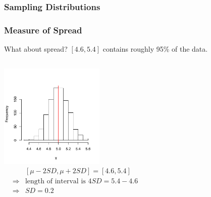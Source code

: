 \documentclass[slides]{beamer}
\newcommand{\blue}[1]{\textcolor{blue2}{#1}}
\newcommand{\xbar}{\overline{x}}
\begin{document}
\begin{frame}[fragile]
\frametitle{Sampling Distributions}

%
%
%

\end{frame}


\begin{frame}[fragile]
\frametitle{Measure of Spread}
What about spread?  $[4.6, 5.4]$ contains roughly 95\% of the data.

\begin{columns}[c]
\includegraphics[width=5cm]{figure/lec12-001}
\pause{}
\begin{eqnarray*}
&& [\mu - 2 SD, \mu + 2SD] = [4.6, 5.4]\\
&\Rightarrow& \mbox{length of interval is } 4SD = 5.4-4.6\\
&\Rightarrow& SD = 0.2
\end{eqnarray*}
\end{columns}




\end{frame}
\end{document}
